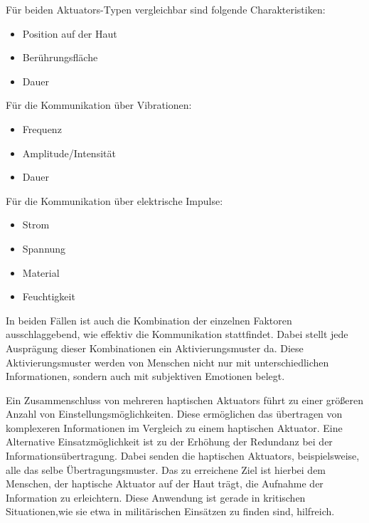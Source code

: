\documentclass{llncs}					%
\begin{document}
Für beiden \glspl{Aktuator}-Typen vergleichbar sind folgende Charakteristiken:
\begin{itemize}
	\item Position auf der Haut
	
	\item Berührungsfläche
	
	\item Dauer
\end{itemize}

Für die Kommunikation über Vibrationen\cite{doi:10.1518/001872008X250638}:
\begin{itemize}
	\item Frequenz
	\item Amplitude/Intensität %
	\item Dauer
\end{itemize}

Für die Kommunikation über elektrische Impulse\cite[S.~4]{68204}:
\begin{itemize}
	\item Strom
	\item Spannung
	\item Material
	\item Feuchtigkeit
\end{itemize}

In beiden Fällen ist auch die Kombination der einzelnen Faktoren ausschlaggebend, wie effektiv die Kommunikation stattfindet. Dabei stellt jede Ausprägung dieser Kombinationen ein Aktivierungsmuster da. Diese Aktivierungsmuster werden von Menschen nicht nur mit unterschiedlichen Informationen, sondern auch mit subjektiven Emotionen belegt\cite{5444662}.%

Ein Zusammenschluss von mehreren haptischen \glspl{Aktuator} führt zu einer größeren Anzahl von Einstellungsmöglichkeiten. Diese ermöglichen das übertragen von komplexeren Informationen im Vergleich zu einem haptischen \gls{Aktuator}. Eine Alternative Einsatzmöglichkeit ist zu der Erhöhung der Redundanz bei der Informationsübertragung. Dabei senden die haptischen \glspl{Aktuator}, beispielsweise, alle das selbe Übertragungsmuster. Das zu erreichene Ziel ist hierbei dem Menschen, der haptische \gls{Aktuator} auf der Haut trägt, die Aufnahme der Information zu erleichtern. Diese Anwendung ist gerade in kritischen Situationen,wie sie etwa in militärischen Einsätzen zu finden sind, hilfreich\cite{nikolic1998multisensory}.
\end{document}
